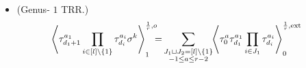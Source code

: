 \documentclass[11pt]{amsart}
\theoremstyle{definition}
\theoremstyle{remark}
\newcommand{\<}{\left<}
\renewcommand{\>}{\right>}
\numberwithin{equation}{section}
\begin{document}
\begin{itemize}
Then
\begin{align*}
\<\tau_{d_1+1}^{a_1}\prod_{i=2}^l\tau^{a_i}_{d_i}\sigma^k\>^{\frac{1}{r},o}_0=&
\sum_{a=-1}^{r-2}\sum_{S \sqcup R = \{3,\ldots,l\}}\left\langle \tau_0^{a}\tau_{d_1}^{a_1}\prod_{i \in S}\tau_{d_i}^{a_i}\right\rangle^{\frac{1}{r},{ext}}_0
\left\langle \tau_0^{r-2-a}\tau^{a_2}_{d_2}\prod_{i\in R}\tau^{a_i}_{d_i}\sigma^k\right\rangle^{\frac{1}{r},o}_0+\\
&+\sum_{\substack{S \sqcup R = \{3,\ldots,l\} \\ k_1 + k_2 = k}} \binom{k}{k_1} \left\langle \tau^{a_1}_{d_1} \prod_{i \in S} \tau^{a_i}_{d_i}\sigma^{k_1}\right\rangle^{\frac{1}{r},o}_0 \left\langle \tau^{a_2}_{d_2}\prod_{i \in R} \tau^{a_i}_{d_i} \sigma^{k_2+1}\right\rangle^{\frac{1}{r}, o}_0.
\end{align*}
\item[(c)](Genus- $1$ TRR.)
\begin{equation}
\begin{split}
\left\langle \tau_{d_{1}+1}^{a_1}\prod_{i\in [l]\setminus \{1\}}\tau^{a_i}_{d_i}\sigma^k\right\rangle^{\frac{1}{r},o}_1\hspace{-0.2cm}
=&\sum_{\substack{J_1 \sqcup J_2 = [l]\setminus\{1\}\\ -1\le a \le r-2}}\hspace{-0.1cm}\left\langle \tau_0^{a}\tau_{d_{1}}^{a_{1}}\prod_{i \in J_1}\tau_{d_i}^{a_i}\right\rangle^{\frac{1}{r},\text{ext}}_0

\end{split}
\end{equation}
\end{itemize}
\end{document}

